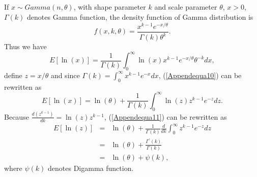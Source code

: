 \documentclass[12pt, draftclsnofoot, onecolumn]{IEEEtran}
\begin{document}
\begin{spacing}{2}
\section{}
If $x\sim Gamma(n, \theta)$, with shape parameter $k$ and scale parameter $\theta$, $x>0$, $\Gamma(k)$ denotes Gamma function, the density function of Gamma distribution is
\begin{equation}
f(x,k,\theta)=\frac{x^{k-1}e^{-x/\theta}}{\Gamma(k)\theta^{k}}.
\label{Appendequa9}
\end{equation}
Thus we have 
\begin{equation}
E[\ln(x)]=\frac{1}{\Gamma(k)}\int_{0}^{\infty}\ln(x)x^{k-1}e^{-x/\theta}\theta^{-k}dx,
\label{Appendequa10}
\end{equation}
define $z=x/\theta$ and since $\Gamma(k)=\int_{0}^{\infty}x^{k-1}e^{-x}dx$, (\ref{Appendequa10}) can be rewritten as
\begin{equation}
E[\ln(x)]=\ln(\theta)+\frac{1}{\Gamma(k)}\int_{0}^{\infty}\ln(z)z^{k-1}e^{-z}dz.
\label{Appendequa11}
\end{equation}
Because $\frac{d(z^{k-1})}{dk}=\ln(z)z^{k-1}$, (\ref{Appendequa11}) can be rewritten as
\begin{eqnarray}
\nonumber
E[\ln(z)]&=&\ln(\theta)+\frac{1}{\Gamma(k)}\frac{d}{dk}\int_{0}^{\infty}z^{k-1}e^{-z}dz\\
\nonumber
&=&\ln(\theta)+\frac{\Gamma^{'}(k)}{\Gamma(k)}\\
\nonumber
&=&\ln(\theta)+\psi(k),
\label{Appendequa12}
\end{eqnarray}
where $\psi(k)$ denotes Digamma function.

\end{spacing}
\end{document}
